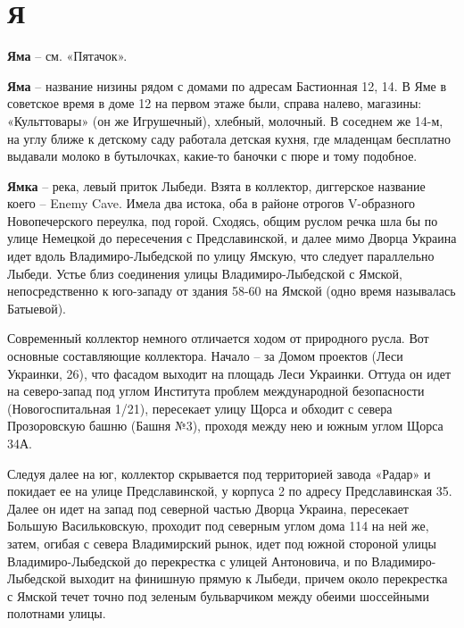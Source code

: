 \chapter*{Я}

\textbf{Яма} – см. «Пятачок».\\

\medskip

\textbf{Яма} – название низины рядом с домами по адресам Бастионная 12, 14. В Яме в советское время в доме 12 на первом этаже были, справа налево, магазины: «Культтовары» (он же Игрушечный), хлебный, молочный. В соседнем же 14-м, на углу ближе к детскому саду работала детская кухня, где младенцам бесплатно выдавали молоко в бутылочках, какие-то баночки с пюре и тому подобное.\\

\medskip

\textbf{Ямка} – река, левый приток Лыбеди. Взята в коллектор, диггерское название коего – Enemy Cave. Имела два истока, оба в районе отрогов V-образного Новопечерского переулка, под горой. Сходясь, общим руслом речка шла бы по улице Немецкой до пересечения с Предславинской, и далее мимо Дворца Украина идет вдоль Владимиро-Лыбедской по улицу Ямскую, что следует параллельно Лыбеди. Устье близ соединения улицы Владимиро-Лыбедской с Ямской, непосредственно к юго-западу от здания 58-60 на Ямской (одно время называлась Батыевой).

Современный коллектор немного отличается ходом от природного русла. Вот основные составляющие коллектора. Начало – за Домом проектов (Леси Украинки, 26), что фасадом выходит на площадь Леси Украинки. Оттуда он идет на северо-запад под углом Института проблем международной безопасности (Новогоспитальная 1/21), пересекает улицу Щорса и обходит с севера Прозоровскую башню (Башня №3), проходя между нею и южным углом Щорса 34А. 

Следуя далее на юг, коллектор скрывается под территорией завода «Радар» и покидает ее на улице Предславинской, у корпуса 2 по адресу Предславинская 35. Далее он идет на запад под северной частью Дворца Украина, пересекает Большую Васильковскую, проходит под северным углом дома 114 на ней же, затем, огибая с севера Владимирский рынок, идет под южной стороной улицы Владимиро-Лыбедской до перекрестка с улицей Антоновича, и по Владимиро-Лыбедской выходит на финишную прямую к Лыбеди, причем около перекрестка с Ямской течет точно под зеленым бульварчиком между обеими шоссейными полотнами улицы.


